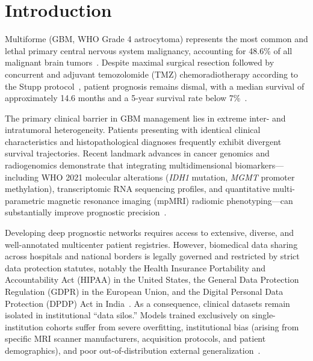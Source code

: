 \documentclass[journal,10pt,twocolumn]{IEEEtran}
\begin{document}
\section{Introduction}
 Multiforme (GBM, WHO Grade 4 astrocytoma) represents the most common and lethal primary central nervous system malignancy, accounting for 48.6\% of all malignant brain tumors~\cite{ostrom2022cbtrus}. Despite maximal surgical resection followed by concurrent and adjuvant temozolomide (TMZ) chemoradiotherapy according to the Stupp protocol~\cite{stupp2005radiotherapy}, patient prognosis remains dismal, with a median survival of approximately 14.6 months and a 5-year survival rate below 7\%~\cite{brennan2013somatic}.

The primary clinical barrier in GBM management lies in extreme inter- and intratumoral heterogeneity. Patients presenting with identical clinical characteristics and histopathological diagnoses frequently exhibit divergent survival trajectories. Recent landmark advances in cancer genomics and radiogenomics demonstrate that integrating multidimensional biomarkers---including WHO 2021 molecular alterations (\textit{IDH1} mutation, \textit{MGMT} promoter methylation), transcriptomic RNA sequencing profiles, and quantitative multi-parametric magnetic resonance imaging (mpMRI) radiomic phenotyping---can substantially improve prognostic precision~\cite{mobadersany2018predicting, huang2020multimodal}.

Developing deep prognostic networks requires access to extensive, diverse, and well-annotated multicenter patient registries. However, biomedical data sharing across hospitals and national borders is legally governed and restricted by strict data protection statutes, notably the Health Insurance Portability and Accountability Act (HIPAA) in the United States, the General Data Protection Regulation (GDPR) in the European Union, and the Digital Personal Data Protection (DPDP) Act in India~\cite{price2019privacy}. As a consequence, clinical datasets remain isolated in institutional ``data silos.'' Models trained exclusively on single-institution cohorts suffer from severe overfitting, institutional bias (arising from specific MRI scanner manufacturers, acquisition protocols, and patient demographics), and poor out-of-distribution external generalization~\cite{sheller2020federated}.
\end{document}
